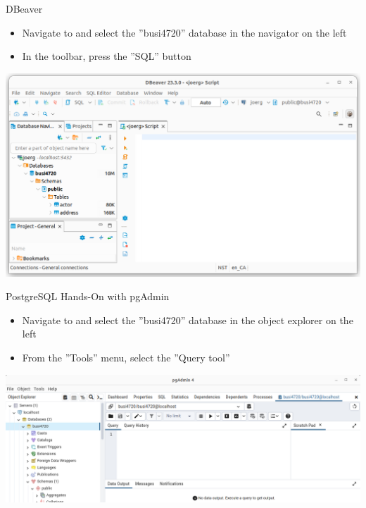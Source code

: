 \documentclass[ignorenonframetext,xcolor=x11names]{beamer}
\begin{document}
\begin{frame}{DBeaver}
\begin{itemize}
   \item Navigate to and select the ''busi4720'' database in the navigator on the left
   \item In the toolbar, press the ''SQL'' button
\end{itemize}
\vspace{3mm}
\centering
\includegraphics[width=.8\textwidth]{screen4.png}
\end{frame}

\begin{frame}[fragile]{PostgreSQL Hands-On with pgAdmin}
\begin{itemize}
  \item Navigate to and select the ''busi4720'' database in the object explorer on the left
  \item From the ''Tools'' menu, select the ''Query tool''
\end{itemize}
\vspace{3mm}
\centering
\includegraphics[width=\textwidth]{screen2.png}
\end{frame}
\end{document}
